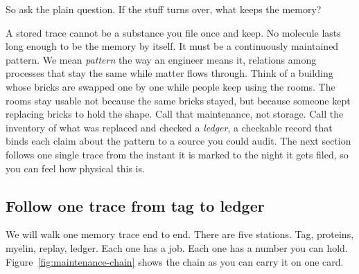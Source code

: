 So ask the plain question. If the stuff turns over, what keeps the memory?

A stored trace cannot be a substance you file once and keep. No molecule lasts long enough to be the memory by itself. It must be a continuously maintained pattern. We mean \textit{pattern} the way an engineer means it, relations among processes that stay the same while matter flows through. Think of a building whose bricks are swapped one by one while people keep using the rooms. The rooms stay usable not because the same bricks stayed, but because someone kept replacing bricks to hold the shape. Call that maintenance, not storage. Call the inventory of what was replaced and checked a \textit{ledger}, a checkable record that binds each claim about the pattern to a source you could audit. The next section follows one single trace from the instant it is marked to the night it gets filed, so you can feel how physical this is.

\subsection*{Follow one trace from tag to ledger}

We will walk one memory trace end to end. There are five stations. Tag, proteins, myelin, replay, ledger. Each one has a job. Each one has a number you can hold. Figure~\ref{fig:maintenance-chain} shows the chain as you can carry it on one card.

